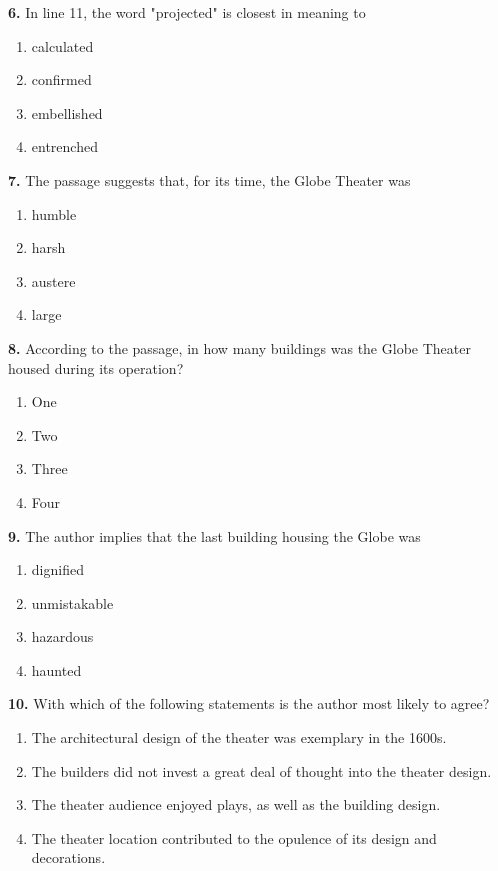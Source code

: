 \documentclass[12pt]{article}
\begin{document}
\noindent\textbf{6.} In line 11, the word "projected" is closest in meaning to
\begin{enumerate}[label=(\Alph*),leftmargin=*,itemsep=0.2em]
\item calculated
\item confirmed
\item embellished
\item entrenched
\end{enumerate}
\par
\vspace{0.25\baselineskip}
\noindent\textbf{7.} The passage suggests that, for its time, the Globe Theater was
\begin{enumerate}[label=(\Alph*),leftmargin=*,itemsep=0.2em]
\item humble
\item harsh
\item austere
\item large
\end{enumerate}
\par
\vspace{0.25\baselineskip}
\noindent\textbf{8.} According to the passage, in how many buildings was the Globe Theater housed during its operation?
\begin{enumerate}[label=(\Alph*),leftmargin=*,itemsep=0.2em]
\item One
\item Two
\item Three
\item Four
\end{enumerate}
\par
\vspace{0.25\baselineskip}
\noindent\textbf{9.} The author implies that the last building housing the Globe was
\begin{enumerate}[label=(\Alph*),leftmargin=*,itemsep=0.2em]
\item dignified
\item unmistakable
\item hazardous
\item haunted
\end{enumerate}
\par
\vspace{0.25\baselineskip}
\noindent\textbf{10.} With which of the following statements is the author most likely to agree?
\begin{enumerate}[label=(\Alph*),leftmargin=*,itemsep=0.2em]
\item The architectural design of the theater was exemplary in the 1600s.
\item The builders did not invest a great deal of thought into the theater design.
\item The theater audience enjoyed plays, as well as the building design.
\item The theater location contributed to the opulence of its design and decorations.
\end{enumerate}
\par
\vspace{0.25\baselineskip}
\end{document}
